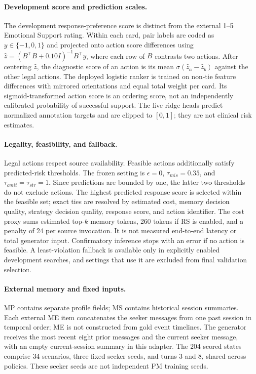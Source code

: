 \paragraph{Development score and prediction scales.}
The development response-preference score is distinct from the external
1--5 Emotional Support rating. Within each card, pair labels are coded as
$y\in\{-1,0,1\}$ and projected onto action score differences using
$\hat z=(B^\top B+0.10I)^{-1}B^\top y$, where each row of $B$ contrasts two
actions. After centering $\hat z$, the diagnostic score of an action is its
mean $\sigma(\hat z_a-\hat z_b)$ against the other legal actions.
The deployed logistic ranker is trained on non-tie feature differences with
mirrored orientations and equal total weight per card. Its sigmoid-transformed
action score is an ordering score, not an independently calibrated probability
of successful support. The five ridge heads predict normalized annotation
targets and are clipped to $[0,1]$; they are not clinical risk estimates.

\paragraph{Legality, feasibility, and fallback.}
Legal actions respect source availability. Feasible actions additionally
satisfy predicted-risk thresholds. The frozen setting is
$\epsilon=0$, $\tau_{mis}=0.35$, and $\tau_{omit}=\tau_{str}=1$.
Since predictions are bounded by one, the latter two thresholds do not
exclude actions. The highest predicted response score is selected within
the feasible set; exact ties are resolved by estimated cost, memory decision
quality, strategy decision quality, response score, and action identifier.
The cost proxy sums estimated top-$k$ memory tokens, 260 tokens if RS is
enabled, and a penalty of 24 per source invocation. It is not measured
end-to-end latency or total generator input. Confirmatory inference stops
with an error if no action is feasible. A least-violation fallback is
available only in explicitly enabled development searches, and settings
that use it are excluded from final validation selection.

\paragraph{External memory and fixed inputs.}
MP contains separate profile fields; MS contains historical session
summaries. Each external ME item concatenates the seeker messages from one
past session in temporal order; ME is not constructed from gold event
timelines. The generator receives the most recent eight prior messages and
the current seeker message, with an empty current-session summary in this
adapter. The 204 scored states comprise 34 scenarios, three fixed seeker
seeds, and turns 3 and 8, shared across policies. These seeker seeds are
not independent PM training seeds.

